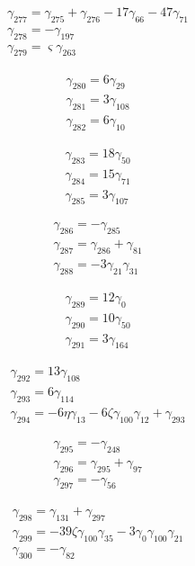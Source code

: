 \[\begin{aligned}\gamma_{277}=\gamma_{275} + \gamma_{276} - 17 \gamma_{66} - 47 \gamma_{71}\\ \gamma_{278}=- \gamma_{197}\\ \gamma_{279}=\varsigma  \gamma_{263}\end{aligned}\]

\[\begin{aligned}\gamma_{280}=6 \gamma_{29}\\ \gamma_{281}=3 \gamma_{108}\\ \gamma_{282}=6 \gamma_{10}\end{aligned}\]

\[\begin{aligned}\gamma_{283}=18 \gamma_{50}\\ \gamma_{284}=15 \gamma_{71}\\ \gamma_{285}=3 \gamma_{107}\end{aligned}\]

\[\begin{aligned}\gamma_{286}=- \gamma_{285}\\ \gamma_{287}=\gamma_{286} + \gamma_{81}\\ \gamma_{288}=- 3 \gamma_{21} \gamma_{31}\end{aligned}\]

\[\begin{aligned}\gamma_{289}=12 \gamma_{0}\\ \gamma_{290}=10 \gamma_{50}\\ \gamma_{291}=3 \gamma_{164}\end{aligned}\]

\[\begin{aligned}\gamma_{292}=13 \gamma_{108}\\ \gamma_{293}=6 \gamma_{114}\\ \gamma_{294}=- 6 \eta  \gamma_{13} - 6 \zeta  \gamma_{100} \gamma_{12} + \gamma_{293}\end{aligned}\]

\[\begin{aligned}\gamma_{295}=- \gamma_{248}\\ \gamma_{296}=\gamma_{295} + \gamma_{97}\\ \gamma_{297}=- \gamma_{56}\end{aligned}\]

\[\begin{aligned}\gamma_{298}=\gamma_{131} + \gamma_{297}\\ \gamma_{299}=- 39 \zeta  \gamma_{100} \gamma_{35} - 3 \gamma_{0} \gamma_{100} \gamma_{21}\\ \gamma_{300}=- \gamma_{82}\end{aligned}\]

